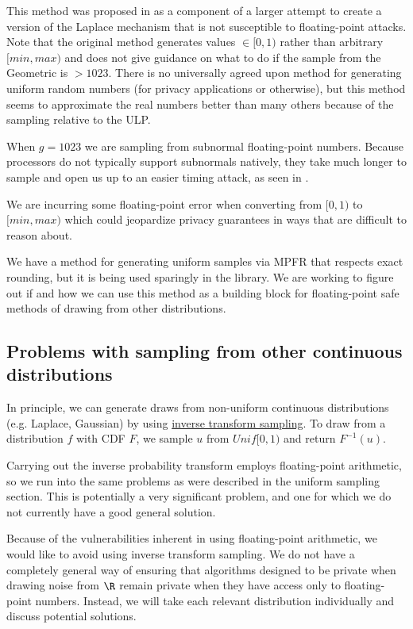 \documentclass[11pt]{scrartcl} %
\begin{document}
This method was proposed in \cite{Mir12} as a component of a larger attempt to create
a version of the Laplace mechanism that is not susceptible to floating-point attacks.
Note that the original method generates values $\in [0,1)$ rather than arbitrary $[min, max)$ 
and does not give guidance on what to do if the sample from the Geometric is $> 1023$.
There is no universally agreed upon method for generating uniform random numbers (for privacy
applications or otherwise), but this method seems to approximate the real numbers better than many
others because of the sampling relative to the ULP. \newline

\begin{tcolorbox}[colback = {green}, title = {Known Privacy Issues}, colbacktitle = black]
	When $g=1023$ we are sampling from subnormal floating-point numbers. Because processors do not typically support
	subnormals natively, they take much longer to sample and open us up to an easier timing attack, as
	seen in \cite{AKM+15}. \newline

	We are incurring some floating-point error when converting from $[0,1)$ to $[min, max)$ which
	could jeopardize privacy guarantees in ways that are difficult to reason about.\cite{Mir12} \cite{Ilv19}
\end{tcolorbox}

We have a method for generating uniform samples via MPFR that respects exact rounding, but it is being used sparingly in the library.
We are working to figure out if and how we can use this method as a building block for floating-point safe methods of drawing from 
other distributions.


\subsection{Problems with sampling from other continuous distributions}
In principle, we can generate draws from non-uniform continuous distributions (e.g. Laplace, Gaussian)
by using \href{https://en.wikipedia.org/wiki/Inverse_transform_sampling}{inverse transform sampling}.
To draw from a distribution $f$ with CDF $F$,
we sample $u$ from $Unif[0,1)$ and return $F^{-1}(u)$. \newline

\begin{tcolorbox}[colback = {green}, title = {Known Privacy Issues}, colbacktitle = black]
	Carrying out the inverse probability transform employs floating-point arithmetic,
	so we run into the same problems as were described in the uniform sampling section.
	This is potentially a very significant problem, and one for which we do not
	currently have a good general solution.
\end{tcolorbox}
Because of the vulnerabilities inherent in using floating-point arithmetic, we would
like to avoid using inverse transform sampling. We do not have a completely general way of ensuring 
that algorithms designed to be private when drawing noise from $\R$ remain private when they have 
access only to floating-point numbers. Instead, we will take each relevant distribution individually 
and discuss potential solutions. \newline 
\end{document}
